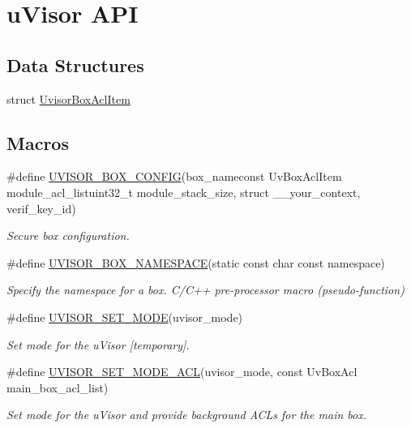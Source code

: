 \hypertarget{group__hypervisor}{}\section{u\+Visor A\+PI}
\label{group__hypervisor}
\subsection*{Data Structures}
\begin{DoxyCompactItemize}
\item 
struct \hyperlink{group__hypervisor_struct_uvisor_box_acl_item}{Uvisor\+Box\+Acl\+Item}
\end{DoxyCompactItemize}
\subsection*{Macros}
\begin{DoxyCompactItemize}
\item 
\#define \hyperlink{group__hypervisor_ga6143739a0475a71e8002f540de3c53f0}{U\+V\+I\+S\+O\+R\+\_\+\+B\+O\+X\+\_\+\+C\+O\+N\+F\+IG}(box\+\_\+nameconst Uv\+Box\+Acl\+Item module\+\_\+acl\+\_\+listuint32\+\_\+t module\+\_\+stack\+\_\+size,  struct \+\_\+\+\_\+your\+\_\+context,  verif\+\_\+key\+\_\+id)
\begin{DoxyCompactList}\small\item\em Secure box configuration. \end{DoxyCompactList}\item 
\#define \hyperlink{group__hypervisor_gafe52bfcc466d459d149c63966c2f4a58}{U\+V\+I\+S\+O\+R\+\_\+\+B\+O\+X\+\_\+\+N\+A\+M\+E\+S\+P\+A\+CE}(static const char const namespace)
\begin{DoxyCompactList}\small\item\em Specify the namespace for a box. C/\+C++ pre-\/processor macro (pseudo-\/function) \end{DoxyCompactList}\item 
\#define \hyperlink{group__hypervisor_ga7cb080278fc7d660addf9bbff6d3f2da}{U\+V\+I\+S\+O\+R\+\_\+\+S\+E\+T\+\_\+\+M\+O\+DE}(uvisor\+\_\+mode)
\begin{DoxyCompactList}\small\item\em Set mode for the u\+Visor \mbox{[}temporary\mbox{]}. \end{DoxyCompactList}\item 
\#define \hyperlink{group__hypervisor_gae90f548ce110da855610f79301aafe34}{U\+V\+I\+S\+O\+R\+\_\+\+S\+E\+T\+\_\+\+M\+O\+D\+E\+\_\+\+A\+CL}(uvisor\+\_\+mode,  const Uv\+Box\+Acl main\+\_\+box\+\_\+acl\+\_\+list)
\begin{DoxyCompactList}\small\item\em Set mode for the u\+Visor and provide background A\+C\+Ls for the main box. \end{DoxyCompactList}\end{DoxyCompactItemize}
